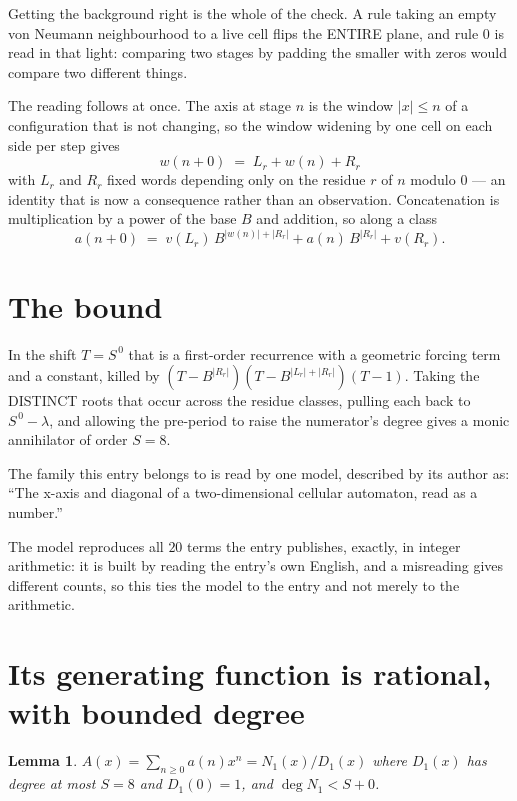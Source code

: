 \documentclass[11pt,a4paper]{article}
\theoremstyle{plain}
\newtheorem{lemma}[theorem]{Lemma}
\theoremstyle{definition}
\begin{document}
Getting the background right is the whole of the check. A rule taking an empty von Neumann
neighbourhood to a live cell flips the ENTIRE plane, and rule 0 is read
in that light: comparing two stages by padding the smaller with zeros would compare two
different things.

The reading follows at once. The axis at stage $n$ is the window $|x|\le n$ of a configuration
that is not changing, so the window widening by one cell on each side per step gives
\[
w(n+0)\;=\;L_r + w(n) + R_r
\]
with $L_r$ and $R_r$ fixed words depending only on the residue $r$ of $n$ modulo $0$ --- an
identity that is now a consequence rather than an observation. Concatenation is multiplication
by a power of the base $B$ and addition, so along a class
\[
a(n+0)\;=\;v(L_r)\,B^{|w(n)|+|R_r|} + a(n)\,B^{|R_r|} + v(R_r).
\]

\section{The bound}

In the shift $T=S^{\,0}$ that is a first-order recurrence with a geometric forcing term and a
constant, killed by $(T-B^{|R_r|})(T-B^{|L_r|+|R_r|})(T-1)$. Taking the DISTINCT roots that
occur across the residue classes, pulling each back to $S^{\,0}-\lambda$, and allowing the
pre-period to raise the numerator's degree gives a monic annihilator of order $S=8$.

The family this entry belongs to is read by one model, described by its author as: ``The x-axis and diagonal of a two-dimensional cellular automaton, read as a number.''


The model reproduces all $20$ terms the entry publishes, exactly, in integer arithmetic:
it is built by reading the entry's own English, and a misreading gives different counts, so
this ties the model to the entry and not merely to the arithmetic.

\section{Its generating function is rational, with bounded degree}

\begin{lemma}\label{lem:rat}
$A(x)=\sum_{n\ge0}a(n)x^n=N_1(x)/D_1(x)$ where $D_1(x)$ has degree at most $S=8$ and
$D_1(0)=1$, and $\deg N_1<S+0$.
\end{lemma}
\end{document}
